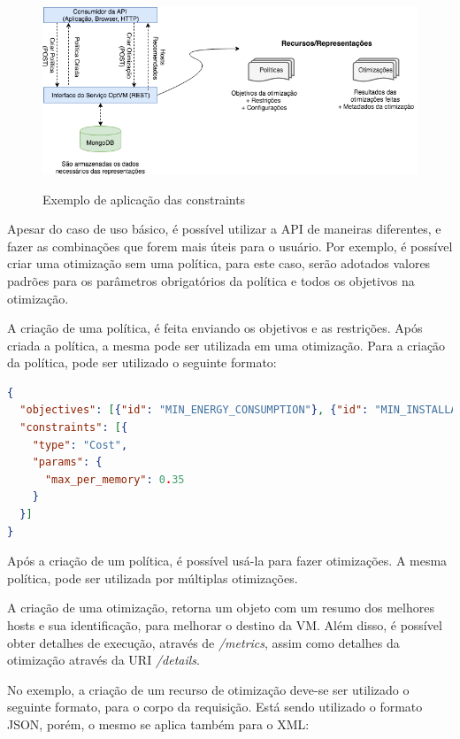 \begin{figure}[!htb]
  \centering
  \caption{Exemplo de aplicação das constraints}
  \includegraphics[width=1\textwidth]{./dados/figuras/overview.png}
  \label{fig:overview}
\end{figure}

Apesar do caso de uso básico, é possível utilizar a API de maneiras diferentes,
e fazer as combinações que forem mais úteis para o usuário. Por exemplo, é possível
criar uma otimização sem uma política, para este caso, serão adotados valores
padrões para os parâmetros obrigatórios da política e todos os objetivos na otimização.

A criação de uma política, é feita enviando os objetivos e as restrições.
Após criada a política, a mesma pode ser utilizada em uma otimização. Para a 
criação da política, pode ser utilizado o seguinte formato:

\begin{lstlisting}[language=json,firstnumber=1]
{
  "objectives": [{"id": "MIN_ENERGY_CONSUMPTION"}, {"id": "MIN_INSTALLATION_TIME"}],
  "constraints": [{
    "type": "Cost",
    "params": {
      "max_per_memory": 0.35
    }
  }]
}
\end{lstlisting}

Após a criação de um política, é possível usá-la para fazer otimizações. A mesma
política, pode ser utilizada por múltiplas otimizações.

A criação de uma otimização, retorna um objeto com um resumo dos melhores hosts
e sua identificação, para melhorar o destino da VM.
Além disso, é possível obter detalhes de execução, através de \textit{/metrics}, assim
como detalhes da otimização através da URI \textit{/details}.

No exemplo, a criação de um recurso de otimização deve-se ser utilizado o seguinte formato, 
para o corpo da requisição. Está sendo utilizado o formato JSON, porém, o mesmo se aplica 
também para o XML:

